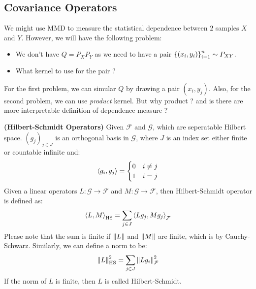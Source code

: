 \subsection{Covariance Operators}

\begin{remark}
    We might use MMD to measure the statistical dependence between $2$ samples $X$ and $Y$. However, we will have the following problem:
    \begin{itemize}
        \item We don't have $Q = P_{X}P_Y$ as we need to have a pair $\left\{ (x_i, y_i) \right\}^n_{i=1} \sim P_{XY}$. 
        \item What kernel to use for the pair ?
    \end{itemize}
    For the first problem, we can simular $Q$ by drawing a pair $(x_i, y_j)$. Also, for the second problem, we can use \emph{product} kernel. But why product ? and is there are more interpretable definition of dependence measure ?
\end{remark}

\begin{definition}{\textbf{(Hilbert-Schmidt Operators)}}
    Given $\mathcal{F}$ and $\mathcal{G}$, which are seperatable Hilbert space. $(g_j)_{j\in J}$ is an orthogonal basis in $\mathcal{G}$, where $J$ is an index set either finite or countable infinite and:
    \begin{equation*}
        \left\langle g_i, g_j \right\rangle = \begin{cases}
            0 & i\ne j \\
            1 & i = j
        \end{cases}
    \end{equation*}
    Given a linear operators $L:\mathcal{G}\rightarrow\mathcal{F}$ and $M:\mathcal{G}\rightarrow\mathcal{F}$, then Hilbert-Schmidt operator is defined as:
    \begin{equation*}
        \left\langle L, M \right\rangle_{\operatorname{HS}} = \sum_{j\in J}\left\langle Lg_j, Mg_j \right\rangle_\mathcal{F}
    \end{equation*}
    Please note that the sum is finite if $\left\lVert L\right\rVert$ and $\left\lVert M\right\rVert$ are finite, which is by Cauchy-Schwarz. Similarly, we can define a norm to be:
    \begin{equation*}
        \left\lVert L\right\rVert^2_{\operatorname{HS}} = \sum_{j\in J}\left\lVert Lg_i\right\rVert^2_\mathcal{F}
    \end{equation*}
    If the norm of $L$ is finite, then $L$ is called Hilbert-Schmidt. 
\end{definition}


